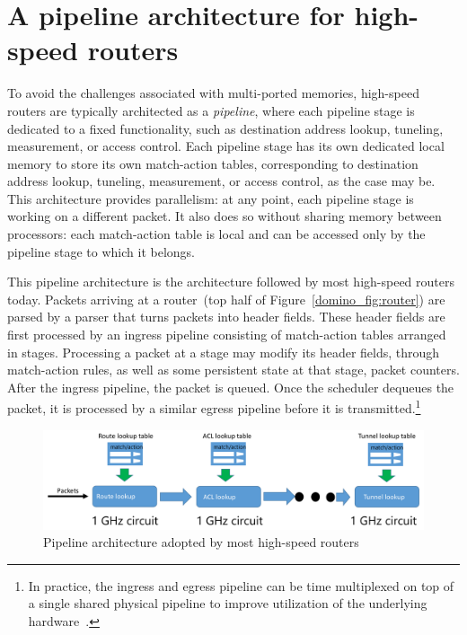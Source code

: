 \section{A pipeline architecture for high-speed routers}
To avoid the challenges associated with multi-ported memories, high-speed
routers are typically architected as a {\em pipeline}, where each pipeline
stage is dedicated to a fixed functionality, such as destination address
lookup, tuneling, measurement, or access control. Each pipeline stage has its
own dedicated local memory to store its own match-action tables, corresponding
to destination address lookup, tuneling, measurement, or access control, as the
case may be. This architecture provides parallelism: at any point, each
pipeline stage is working on a different packet. It also does so without
sharing memory between processors: each match-action table is local and can be
accessed only by the pipeline stage to which it belongs.

This pipeline architecture is the architecture followed by most high-speed
routers today. Packets arriving at a router~(top half of
Figure~\ref{domino_fig:router}) are parsed by a parser that turns
packets into header fields. These header fields are first processed by an
ingress pipeline consisting of match-action tables arranged in stages.
Processing a packet at a stage may modify its header fields, through
match-action rules, as well as some persistent state at that stage, \eg packet
counters. After the ingress pipeline, the packet is queued. Once the scheduler
dequeues the packet, it is processed by a similar egress pipeline before it is
transmitted.\footnote{In practice, the ingress and egress pipeline can be time
multiplexed on top of a single shared physical pipeline to improve utilization
of the underlying hardware~\cite{rmt}.}

\begin{figure}[!t]
\includegraphics[width=\textwidth]{pipeline.pdf}
\caption{Pipeline architecture adopted by most high-speed routers}
\label{fig:pipeline}
\end{figure}

